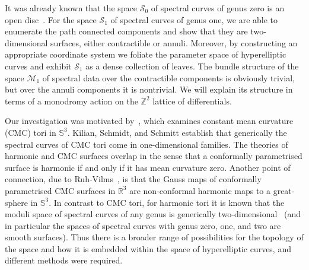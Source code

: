 \documentclass{article}
\numberwithin{equation}{section}
\numberwithin{figure}{section}
\newcommand{\Z}{\mathbb{Z}}
\newcommand{\R}{\mathbb{R}}
\renewcommand{\S}{\mathbb{S}}
\begin{document}
It was already known that the space $\mathcal{S}_0$ of spectral curves of genus zero is an open disc~\cite[Section 9]{Hitchin1990}.
For the space $\mathcal{S}_1$ of spectral curves of genus one, we are able to enumerate the path connected components and show that they are two-dimensional surfaces, either contractible or annuli. Moreover, by constructing an appropriate coordinate system we foliate the parameter space of hyperelliptic curves and exhibit $\mathcal{S}_1$ as a dense collection of leaves.
The bundle structure of the space $\mathcal{M}_1$ of spectral data over the contractible components is obviously trivial, but over the annuli components it is nontrivial. We will explain its structure in terms of a monodromy action on the $\Z^2$ lattice of differentials.

Our investigation was motivated by~\cite{Kilian2015}, which examines constant mean curvature (CMC) tori in $\S^3$. 
Kilian, Schmidt, and Schmitt establish that generically the spectral curves of CMC tori come in one-dimensional families. The theories of harmonic and CMC surfaces overlap in the sense that a conformally parametrised surface is harmonic if and only if it has mean curvature zero.
Another point of connection, due to Ruh-Vilms~\cite{Ruh1970}, is that the Gauss maps of conformally parametrised CMC surfaces in $\R^3$ are non-conformal harmonic maps to a great-sphere in $\S^3$.
In contrast to CMC tori, for harmonic tori it is known that the moduli space of spectral curves of any genus is generically two-dimensional~\cite{Carberry2019} (and in particular the spaces of spectral curves with genus zero, one, and two are smooth surfaces). Thus there is a broader range of possibilities for the topology of the space and how it is embedded within the space of hyperelliptic curves, and different methods were required.
\end{document}
